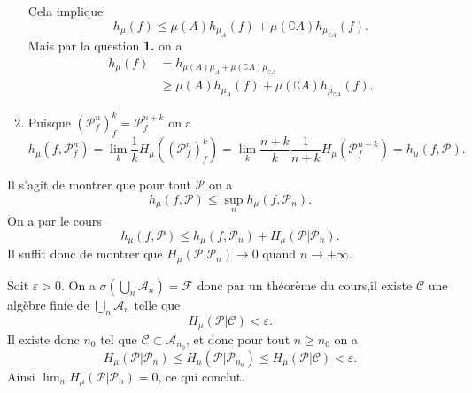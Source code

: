 \documentclass[a4paper,12pt,openany]{article}
\theoremstyle{plain}
\theoremstyle{definition}
\newcommand{\Pcal}{\mathcal{P}}
\newcommand{\Fcal}{\mathcal{F}}
\newcommand{\Acal}{\mathcal{A}}
\newcommand{\Ccal}{\mathcal{C}}
\begin{document}
\begin{enumerate}
Cela implique
$$
h_\mu(f) \leqslant \mu(A) h_{\mu_A}(f) + \mu(\complement A) h_{\mu_{\complement A}}(f).
$$
 Mais par la question \textbf{1.} on a 
$$
\begin{aligned}
h_\mu(f) &= h_{\mu(A) \mu_A + \mu(\complement A) \mu_{\complement A}}  \\
&\geqslant \mu(A) h_{\mu_A}(f) + \mu(\complement A) h_{\mu_{\complement A}}(f).
\end{aligned}
$$


\item Puisque $(\Pcal^n_f)^{k}_f = \Pcal^{n+k}_f$ on a 
$$
h_\mu(f, \Pcal^n_f) = \lim_k \frac{1}{k} H_\mu((\Pcal^n_f)^k_f) = \lim_k \frac{n+k}{k} \frac{1}{n+k} H_\mu(\Pcal^{n+k}_f) = h_\mu(f, \Pcal).
$$

\end{enumerate}

\vspace{0.6cm}

 \vspace{1.5mm} 

\noindent
Il s'agit de montrer que pour tout $\Pcal$ on a 
$$
h_\mu(f, \Pcal) \leqslant \sup_n h_\mu(f, \Pcal_n).
$$
 On a par le cours
$$
h_\mu(f, \Pcal) \leqslant h_\mu(f, \Pcal_n) + H_\mu(\Pcal|\Pcal_n).
$$
Il suffit donc de montrer que $H_\mu(\Pcal|\Pcal_n) \to 0$ quand $n \to +\infty.$  

\noindent
Soit $\varepsilon > 0.$ On a  $\sigma\left(\bigcup_n \Acal_n\right) = \Fcal$ donc par un th\'eor\`eme du cours,il existe $\Ccal$ une alg\`ebre finie de $\bigcup_n \Acal_{n}$ telle que 
$$
H_\mu(\Pcal|\Ccal) < \varepsilon.
$$
 Il existe donc $n_0$ tel que $\Ccal \subset \Acal_{n_0}$, et donc pour tout $n \geqslant n_0$ on a
$$
H_\mu(\Pcal|\Pcal_n) \leqslant H_\mu(\Pcal|\Pcal_{n_0}) \leqslant H_\mu(\Pcal|\Ccal) < \varepsilon.
$$
 Ainsi $\lim_n H_\mu(\Pcal|\Pcal_n) = 0$, ce qui conclut.
\vspace{0.6cm}


 \vspace{1.5mm} 
\end{document}

